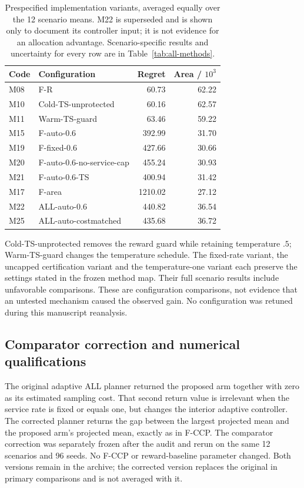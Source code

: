 \documentclass[11pt]{article}
\theoremstyle{remark}
\begin{document}
\begin{table}[t]
\centering
\caption{Prespecified implementation variants, averaged equally over the 12 scenario means. M22 is superseded and is shown only to document its controller input; it is not evidence for an allocation advantage. Scenario-specific results and uncertainty for every row are in Table~\ref{tab:all-methods}.}
\label{tab:implementation-ablations}
\footnotesize
\begin{tabular}{llrr}
\toprule
Code & Configuration & Regret & Area / $10^3$ \\
\midrule
M08 & F-R & 60.73 & 62.22 \\
M10 & Cold-TS-unprotected & 60.16 & 62.57 \\
M11 & Warm-TS-guard & 63.46 & 59.22 \\
M15 & F-auto-0.6 & 392.99 & 31.70 \\
M19 & F-fixed-0.6 & 427.66 & 30.66 \\
M20 & F-auto-0.6-no-service-cap & 455.24 & 30.93 \\
M21 & F-auto-0.6-TS & 400.94 & 31.42 \\
M17 & F-area & 1210.02 & 27.12 \\
M22 & ALL-auto-0.6 & 440.82 & 36.54 \\
M25 & ALL-auto-costmatched & 435.68 & 36.72 \\
\bottomrule
\end{tabular}
\end{table}

Cold-TS-unprotected removes the reward guard while retaining temperature $.5$; Warm-TS-guard changes the temperature schedule. The fixed-rate variant, the uncapped certification variant and the temperature-one variant each preserve the settings stated in the frozen method map. Their full scenario results include unfavorable comparisons. These are configuration comparisons, not evidence that an untested mechanism caused the observed gain. No configuration was retuned during this manuscript reanalysis.

\subsection{Comparator correction and numerical qualifications}
The original adaptive ALL planner returned the proposed arm together with zero as its estimated sampling cost. That second return value is irrelevant when the service rate is fixed or equals one, but changes the interior adaptive controller. The corrected planner returns the gap between the largest projected mean and the proposed arm's projected mean, exactly as in F-CCP. The comparator correction was separately frozen after the audit and rerun on the same 12 scenarios and 96 seeds. No F-CCP or reward-baseline parameter changed. Both versions remain in the archive; the corrected version replaces the original in primary comparisons and is not averaged with it.
\end{document}
